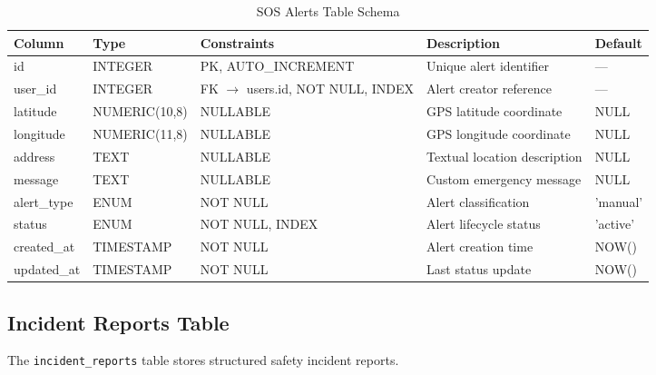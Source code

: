 \begin{table}[H]
  \centering
  \caption{SOS Alerts Table Schema}
  \label{tab:schema-sos}
  \begin{tabularx}{\textwidth}{@{}l l l X l@{}}
    \toprule
    \textbf{Column} & \textbf{Type} & \textbf{Constraints} & \textbf{Description} & \textbf{Default} \\
    \midrule
    id & INTEGER & PK, AUTO\_INCREMENT & Unique alert identifier & --- \\
    user\_id & INTEGER & FK $\to$ users.id, NOT NULL, INDEX & Alert creator reference & --- \\
    latitude & NUMERIC(10,8) & NULLABLE & GPS latitude coordinate & NULL \\
    longitude & NUMERIC(11,8) & NULLABLE & GPS longitude coordinate & NULL \\
    address & TEXT & NULLABLE & Textual location description & NULL \\
    message & TEXT & NULLABLE & Custom emergency message & NULL \\
    alert\_type & ENUM & NOT NULL & Alert classification & 'manual' \\
    status & ENUM & NOT NULL, INDEX & Alert lifecycle status & 'active' \\
    created\_at & TIMESTAMP & NOT NULL & Alert creation time & NOW() \\
    updated\_at & TIMESTAMP & NOT NULL & Last status update & NOW() \\
    \bottomrule
  \end{tabularx}
\end{table}

\subsection{Incident Reports Table}

The \texttt{incident\_reports} table stores structured safety incident reports.

